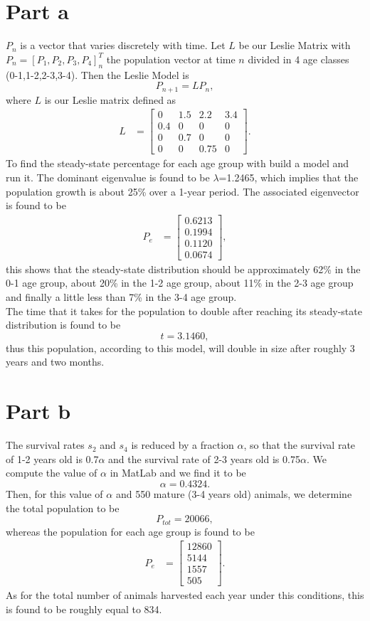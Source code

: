 \section{Part a}
$P_{n}$ is a vector that varies discretely with time. Let $L$ be our Leslie Matrix with $P_{n} = [P_{1}, P_{2}, P_{3}, P_{4}]_{n}^{T}$ the population vector at time $n$ divided in 4 age classes (0-1,1-2,2-3,3-4). Then the Leslie Model is
$$
P_{n+1}=LP_{n},
$$
where $L$ is our Leslie matrix defined as
\begin{align}
L  &= \begin{bmatrix}
0 & 1.5 & 2.2 & 3.4 \\
0.4 & 0 & 0 & 0 \\
0 & 0.7 & 0 & 0\\
0 & 0 & 0.75 & 0
\end{bmatrix}.
\end{align}
To find the steady-state percentage for each age group with build a model and run it. The dominant eigenvalue is found to be $\lambda$=1.2465, which implies that the population growth is about 25\% over a 1-year period. The associated eigenvector is found to be\\
\begin{align}
\textbf{$P_{e}$} &= \begin{bmatrix}
0.6213\\
0.1994\\
0.1120\\
0.0674
\end{bmatrix},
\end{align}
this shows that the steady-state distribution should be approximately 62\% in the 0-1 age group, about 20\% in the 1-2 age group, about 11\% in the 2-3 age group and finally a little less than 7\% in the 3-4 age group.\\
The time that it takes for the population to double after reaching its steady-state distribution is found to be
$$
t=3.1460,
$$
thus this population, according to this model, will double in size after roughly 3 years and two months.

\section{Part b}
The survival rates $s_{2}$ and $s_{4}$ is reduced by a fraction $\alpha$, so that the survival rate of 1-2 years old is 0.7$\alpha$ and the survival rate of 2-3 years old is 0.75$\alpha$. We compute the value of $\alpha$ in MatLab and we find it to be
$$
\alpha = 0.4324.
$$
Then, for this value of $\alpha$ and 550 mature (3-4 years old) animals, we determine the total population to be
$$
P_{tot} = 20066,
$$
whereas the population for each age group is found to be
\begin{align}
\textbf{$P_{e}$} &= \begin{bmatrix}
12860\\
5144\\
1557\\
505
\end{bmatrix}.
\end{align}
As for the total number of animals harvested each year under this conditions, this is found to be roughly equal to 834.
